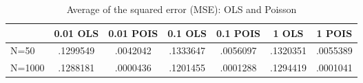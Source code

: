 \begin{table}[htbp]\centering
\caption{Average of the squared error (MSE): OLS and Poisson}
\begin{tabular}{l*{6}{c}}
\toprule
            &    0.01 OLS&   0.01 POIS&     0.1 OLS&    0.1 POIS&       1 OLS&      1 POIS\\
\midrule
N=50        &    .1299549&    .0042042&    .1333647&    .0056097&    .1320351&    .0055389\\
N=1000      &    .1288181&    .0000436&    .1201455&    .0001288&    .1294419&    .0001041\\
\bottomrule
\end{tabular}
\end{table}
